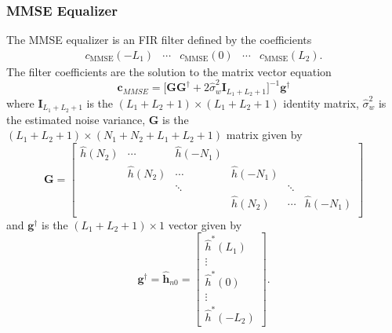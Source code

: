 \subsubsection{MMSE Equalizer}

The MMSE equalizer is an FIR filter defined by the coefficients
\begin{equation}
\begin{matrix}
c_\text{MMSE}(-L_1) & \cdots & c_\text{MMSE}(0) & \cdots & c_\text{MMSE}(L_2).
\end{matrix}
\end{equation}
The filter coefficients are the solution to the matrix vector equation \cite[eq. (330) and (333)]{PAQ-phase1}
\begin{equation}
\mathbf{c}_{MMSE} = \big[ \mathbf{G}\mathbf{G}^\dagger + 2\hat{\sigma}^2_w\mathbf{I}_{L_1+L_2+1} \big]^{-1} \mathbf{g}^\dagger
\label{eq:c_MMSE_direct}
\end{equation}
where $\mathbf{I}_{L_1+L_2+1}$ is the $(L_1+L_2+1)\times(L_1+L_2+1)$ identity matrix,
$\hat{\sigma}^2_w$ is the estimated noise variance, $\mathbf{G}$ is the $(L_1+L_2+1)\times(N_1+N_2+L_1+L_2+1)$ matrix given by
\begin{equation}
\mathbf{G} = 
		\begin{bmatrix}
		\hat{h}(N_2)		& \cdots		& \hat{h}(-N_1) 	&  				  \\
							& \hat{h}(N_2)	& \cdots 			& \hat{h}(-N_1)	  \\
				 			& 				& \ddots 			&  				& \ddots	  \\
		 					&  	   			&  					& \hat{h}(N_2)	& \cdots	& \hat{h}(-N_1)	\\
	\end{bmatrix}
\end{equation}
and $\mathbf{g}^\dagger$ is the $(L_1+L_2+1)\times1$ vector given by
\begin{equation}
\mathbf{g}^\dagger = \hat{\mathbf{h}}_{n0} = \begin{bmatrix} \hat{h}^\ast(L_1) \\ \vdots \\ \hat{h}^\ast(0) \\ \vdots \\ \hat{h}^\ast(-L_2)  \end{bmatrix}.
\label{eq:g_dagger_h_n0}
\end{equation}

